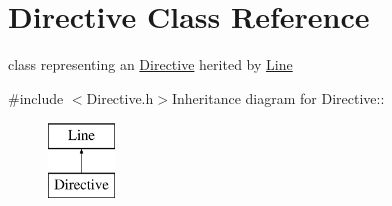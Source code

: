 \hypertarget{classDirective}{
\section{Directive Class Reference}
\label{classDirective}
}


class representing an \hyperlink{classDirective}{Directive} herited by \hyperlink{classLine}{Line}  


{\ttfamily \#include $<$Directive.h$>$}Inheritance diagram for Directive::\begin{figure}[H]
\begin{center}
\leavevmode
\includegraphics[height=2cm]{classDirective}
\end{center}
\end{figure}
